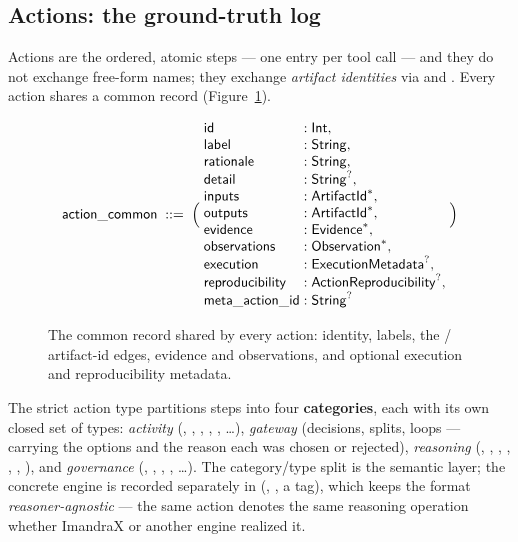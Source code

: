 \subsection{Actions: the ground-truth log}\label{sec:format-actions}

Actions are the ordered, atomic steps --- one entry per tool call --- and they do not exchange
free-form names; they exchange \emph{artifact identities} via  and . Every
action shares a common record (Figure~\ref{fig:fmt-action-common}).

\begin{figure}[H]
\centering
\[
\id{action\_common} \;::=\; \Big(\;
\begin{array}{@{}l@{\;:\;}l@{}}
\id{id}              & \id{Int},\\
\id{label}           & \id{String},\\
\id{rationale}       & \id{String},\\
\id{detail}          & \opt{\id{String}},\\
\id{inputs}          & \many{\id{ArtifactId}},\\
\id{outputs}         & \many{\id{ArtifactId}},\\
\id{evidence}        & \many{\id{Evidence}},\\
\id{observations}    & \many{\id{Observation}},\\
\id{execution}       & \opt{\id{ExecutionMetadata}},\\
\id{reproducibility} & \opt{\id{ActionReproducibility}},\\
\id{meta\_action\_id} & \opt{\id{String}}
\end{array}
\;\Big)
\]
\caption{The common record shared by every action: identity, labels, the / artifact-id edges, evidence and observations, and optional execution and reproducibility metadata.}
\label{fig:fmt-action-common}
\end{figure}

The strict action type partitions steps into four \textbf{categories}, each with its own closed set
of types: \emph{activity} (, , , ,
, \ldots), \emph{gateway} (decisions, splits, loops --- carrying the options and
the reason each was chosen or rejected), \emph{reasoning} (,
, , , ,
, ), and \emph{governance} (,
, , , \ldots). The category/type split is the
semantic layer; the concrete engine is recorded separately in 
(, , a  tag), which
keeps the format \emph{reasoner-agnostic} --- the same  action denotes the
same reasoning operation whether ImandraX or another engine realized it.

